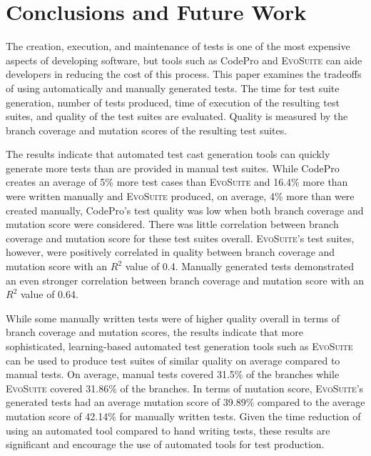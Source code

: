
\section{Conclusions and Future Work}
\label{sec:conclusion}

The creation, execution, and maintenance of tests is one of the most expensive aspects of developing software, but tools
such as CodePro and \textsc{EvoSuite} can aide developers in reducing the cost of this process.  This paper examines the
tradeoffs of using automatically and manually generated tests.  The time for test suite generation, number of tests
produced, time of execution of the resulting test suites, and quality of the test suites are evaluated.  Quality is
measured by the branch coverage and mutation scores of the resulting test suites.

The results indicate that automated test cast generation tools can quickly generate more tests than are provided in manual test suites.  While CodePro creates an average of 5\% more test cases than \textsc{EvoSuite} and 16.4\% more than were written manually and \textsc{EvoSuite} produced, on average, 4\% more than were created manually, CodePro's test quality was low when both branch coverage and mutation score were considered.  There was little correlation between branch coverage and mutation score for these test suites overall.  \textsc{EvoSuite}'s test suites, however, were positively correlated in quality between branch coverage and mutation score with an $R^2$ value of 0.4.  Manually generated tests demonstrated an even stronger correlation between branch coverage and mutation score with an $R^2$ value of 0.64.  

While some manually written tests were of higher quality overall in terms of branch coverage and mutation scores, the results indicate that more sophisticated, learning-based automated test generation tools such as \textsc{EvoSuite} can be used to produce test suites of similar quality on average compared to manual tests.  On average, manual tests covered 31.5\% of the branches while  \textsc{EvoSuite} covered 31.86\% of the branches. In terms of mutation score, \textsc{EvoSuite}'s generated tests had an average mutation score of 39.89\% compared to the average mutation score of 42.14\% for manually written tests.  Given the time reduction of using an automated tool compared to hand writing tests, these results are significant and encourage the use of automated tools for test production.  

